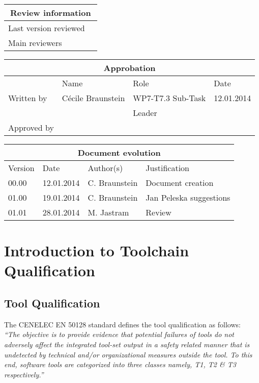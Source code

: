 \documentclass{openetcs_report}
\begin{document}
\begin{tabular}{|p{4.4cm}|p{8.7cm}|}
\hline
\multicolumn{2}{|c|}{Review information} \\
\hline
Last version reviewed &  \\
\hline
Main reviewers &  \\
\hline
\end{tabular}

\begin{tabular}{|p{2.2cm}|p{4cm}|p{4cm}|p{2cm}|}
\hline
\multicolumn{4}{|c|}{Approbation} \\
\hline
  &  Name & Role & Date   \\
\hline  
Written by    &  Cécile Braunstein & WP7-T7.3 Sub-Task  & 12.01.2014 \\
&  & Leader&\\
\hline
Approved by &  &   &  \\
\hline
\end{tabular}

\begin{tabular}{|p{2.2cm}|p{2cm}|p{3cm}|p{5cm}|}
\hline
\multicolumn{4}{|c|}{Document evolution} \\
\hline
Version &  Date & Author(s) & Justification  \\
\hline  
00.00 & 12.01.2014 & C. Braunstein  &  Document creation  \\
01.00 & 19.01.2014 & C. Braunstein  &  Jan Peleska suggestions \\
01.01 & 28.01.2014 & M. Jastram  &  Review \\


\hline  
\end{tabular}
\newpage


\mainmatter







\chapter{Introduction to Toolchain Qualification}
\label{chap-1}
\section{Tool Qualification}
\label{sec-1-1}


The CENELEC EN 50128 standard \cite{standard_railway_2011} defines the tool
qualification as follows:\\
{\it ``The objective is to provide evidence that potential
failures of tools do not adversely affect the integrated tool-set output in a
safety related manner that is undetected by technical and/or organizational
measures outside the tool. To this end, software tools are categorized into
three classes namely, T1, T2 \& T3 respectively.''}
\end{document}
